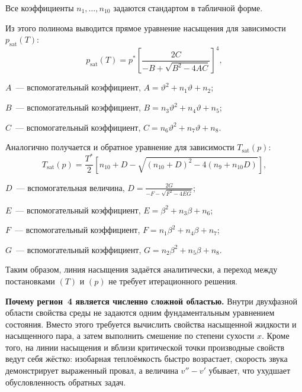Все коэффициенты $n_{1},\dots,n_{10}$
задаются стандартом в табличной форме.

Из этого полинома выводится прямое уравнение насыщения
для зависимости $p_{\mathrm{sat}}(T)$:
\begin{equation}
p_{\mathrm{sat}}(T) = p^{*}
\left[
\frac{2C}{-B + \sqrt{B^{2} - 4AC}}
\right]^{4},
\end{equation}
\begin{gostwhere}
  \item $A$~--- вспомогательный коэффициент, $A = \vartheta^{2} + n_{1}\vartheta + n_{2}$;
  \item $B$~--- вспомогательный коэффициент, $B = n_{3}\vartheta^{2} + n_{4}\vartheta + n_{5}$;
  \item $C$~--- вспомогательный коэффициент, $C = n_{6}\vartheta^{2} + n_{7}\vartheta + n_{8}$.
\end{gostwhere}

Аналогично получается и обратное уравнение
для зависимости $T_{\mathrm{sat}}(p)$:
\begin{equation}
T_{\mathrm{sat}}(p) = \frac{T^{*}}{2}
\left[
n_{10} + D - \sqrt{(n_{10}+D)^{2} - 4(n_{9} + n_{10}D)}
\right],
\end{equation}
\begin{gostwhere}
  \item $D$~--- вспомогательная величина, $D = \frac{2G}{-F - \sqrt{F^{2} - 4EG}}$;
  \item $E$~--- вспомогательный коэффициент, $E = \beta^{2} + n_{3}\beta + n_{6}$;
  \item $F$~--- вспомогательный коэффициент, $F = n_{1}\beta^{2} + n_{4}\beta + n_{7}$;
  \item $G$~--- вспомогательный коэффициент, $G = n_{2}\beta^{2} + n_{5}\beta + n_{8}$.
\end{gostwhere}

Таким образом, линия насыщения
задаётся аналитически,
а переход между постановками $(T)$ и $(p)$
не требует итерационного решения.

\textbf{Почему регион~4 является численно сложной областью.}
Внутри двухфазной области свойства среды
не задаются одним фундаментальным уравнением состояния.
Вместо этого требуется вычислить свойства насыщенной жидкости
и насыщенного пара,
а затем выполнить смешение по степени сухости $x$.
Кроме того, на линии насыщения и вблизи критической точки
производные свойств ведут себя жёстко:
изобарная теплоёмкость быстро возрастает,
скорость звука демонстрирует выраженный провал,
а величина $v''-v'$ убывает,
что ухудшает обусловленность обратных задач.

